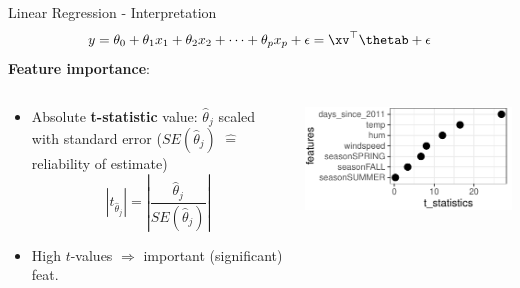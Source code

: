 \documentclass[11pt,compress,t,notes=noshow, aspectratio=169, xcolor=table]{beamer}
\begin{document}
     
\begin{frame}{Linear Regression - Interpretation}
\vspace{-0.2cm}
$$y = \theta_0 + \theta_1 x_1 + \theta_2 x_2 + \dots + \theta_p x_p + \epsilon = \xv^\top \thetab + \epsilon$$
    \textbf{Feature importance}:
    \begin{columns}[T, totalwidth=\linewidth]
    \begin{column}{0.6\textwidth}
    \begin{itemize}
        \item Absolute \textbf{t-statistic} value: $\hat\theta_j$ scaled with standard error ($SE(\hat\theta_j)$ $\hat =$ reliability of estimate) 
    $$|t_{\hat\theta_j}| = \left| \frac{\hat\theta_j}{SE(\hat\theta_j)} \right|$$
        \item High $t$-values $\Rightarrow$ important (significant) feat.
    \end{itemize}
    \end{column}
    \begin{column}{0.4\textwidth}
        \includegraphics[width=\textwidth]{figure/t_stat.pdf} 
    \end{column}
    \end{columns}
    \vspace{0.3cm}
\end{frame}
\end{document}
